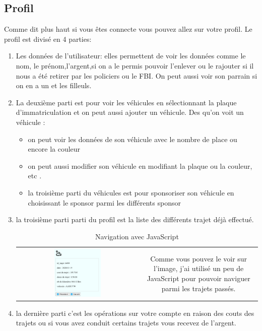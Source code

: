 	\subsection{Profil} 
		Comme dit plus haut si vous êtes connecte vous pouvez allez sur votre profil. 
		Le profil est divisé en 4 parties:
		\begin{enumerate}
			\item
				Les données de l'utilisateur: elles permettent de voir les données comme le nom, le prénom,l'argent,si on a le permis pouvoir l'enlever ou le rajouter si il nous a été retirer par les policiers ou le FBI. On peut aussi voir son parrain si on en a un et les filleuls.
			\item 
				La deuxième parti est pour voir les véhicules en sélectionnant la plaque d'immatriculation et on peut aussi ajouter un véhicule.  
				Des qu'on voit un véhicule :
				\begin{itemize}
					 \item 
					 	on peut voir les données de son véhicule avec le nombre de place ou encore la couleur 
					 \item 
					 	on peut aussi modifier son véhicule en modifiant la plaque ou la couleur, etc .
					 \item  
					 	la troisième parti du véhicules est pour sponsoriser son véhicule en choisissant le sponsor parmi les différents sponsor 
				\end{itemize}
			\item 
				la troisième parti parti du profil est la liste des différents trajet déjà effectué.

				\begin{table}[h!]
					\centering
					\begin{tabular}{cc}
						\includegraphics[width=0.4\textwidth]{trajet.png} & 
						\begin{minipage}[c]{0.5\textwidth}
							Comme vous pouvez le voir sur l'image, j'ai utilisé un peu de JavaScript pour pouvoir naviguer parmi les trajets passés.
						\end{minipage}
					\end{tabular}
					\caption{Navigation avec JavaScript}
					\label{fig:exemple}
				\end{table}
			\item 
				la dernière parti c'est les opérations sur votre compte en raison des couts des trajets ou si vous avez conduit certains trajets vous recevez de l'argent. 	
		\end{enumerate}

